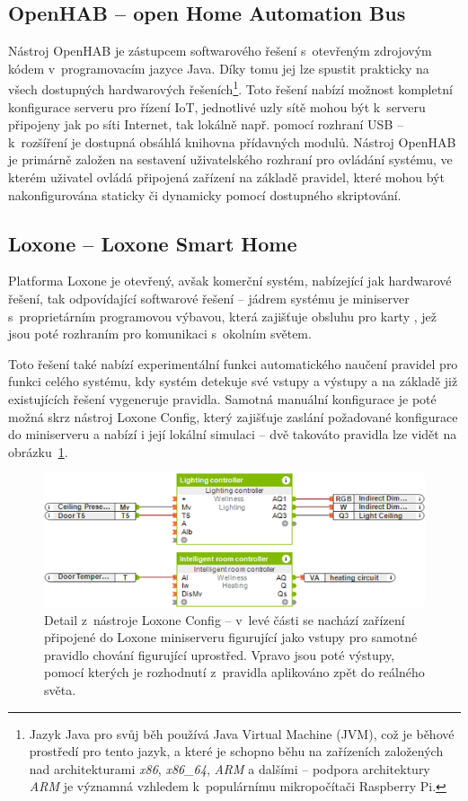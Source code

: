 \subsection{OpenHAB -- open Home Automation Bus}\label{subsec:openhab}
Nástroj OpenHAB je zástupcem softwarového řešení s~otevřeným zdrojovým kódem v~programovacím jazyce Java.
Díky tomu jej lze spustit prakticky na všech dostupných hardwarových řešeních\footnote{Jazyk Java pro svůj běh
používá Java Virtual Machine (JVM), což je běhové prostředí pro tento jazyk, a které je schopno běhu na zařízeních
založených nad architekturami \textit{x86}, \textit{x86\_64}, \textit{ARM} a dalšími -- podpora architektury
\textit{ARM} je významná vzhledem k~populárnímu mikropočítači Raspberry Pi.}.
Toto řešení nabízí možnost kompletní konfigurace serveru pro řízení IoT, jednotlivé uzly sítě mohou být k~serveru
připojeny jak po síti Internet, tak lokálně např. pomocí rozhraní USB -- k~rozšíření je dostupná obsáhlá
knihovna přídavných modulů.
Nástroj OpenHAB je primárně založen na sestavení uživatelského rozhraní pro ovládání systému, ve kterém uživatel ovládá
připojená zařízení na základě pravidel, které mohou být nakonfigurována staticky či dynamicky pomocí dostupného
skriptování.

\subsection{Loxone -- Loxone Smart Home}\label{subsec:loxone}
Platforma Loxone je otevřený, avšak komerční systém, nabízející jak hardwarové řešení, tak odpovídající softwarové
řešení --
jádrem systému je miniserver s~proprietárním programovou výbavou, která zajišťuje obsluhu pro karty , jež jsou poté rozhraním pro komunikaci s~okolním světem.

Toto řešení také nabízí experimentální funkci automatického naučení pravidel pro funkci celého systému, kdy
systém detekuje své vstupy a výstupy a na základě již existujících řešení vygeneruje pravidla.
Samotná manuální konfigurace je poté možná skrz nástroj Loxone Config, který zajišťuje zaslání požadované
konfigurace do miniserveru a nabízí i její lokální simulaci -- dvě takováto pravidla lze vidět na
obrázku~\ref{fig:iot-loxone-config}.

\begin{figure}%
    \centering
    \includegraphics[width=.75\textwidth]{figures/iot-loxone-config.png}
    \caption{Detail z~nástroje Loxone Config -- v~levé části se nachází zařízení připojené do Loxone miniserveru
    figurující jako vstupy pro samotné pravidlo chování figurující uprostřed.
    Vpravo jsou poté výstupy, pomocí kterých je rozhodnutí z~pravidla aplikováno zpět do reálného světa\protect\footnotemark.}
    \label{fig:iot-loxone-config}
\end{figure}

